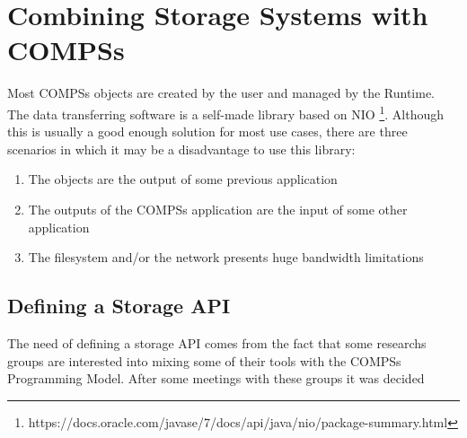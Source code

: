 \section{Combining Storage Systems with COMPSs}
\label{sec:storage}
Most COMPSs objects are created by the user and managed by the Runtime. The data transferring software is a self-made library based on NIO \footnote{https://docs.oracle.com/javase/7/docs/api/java/nio/package-summary.html}. Although this is usually a good enough solution for most use cases, there are three scenarios in which it may be a disadvantage to use this library:

\begin{enumerate}
\item The objects are the output of some previous application
\item The outputs of the COMPSs application are the input of some other application
\item The filesystem and/or the network presents huge bandwidth limitations
\end{enumerate}



\subsection{Defining a Storage API}
\label{subsec:storage_api}
The need of defining a storage API comes from the fact that some researchs groups are interested into mixing some of their tools with the COMPSs Programming Model. After some meetings with these groups it was decided 

